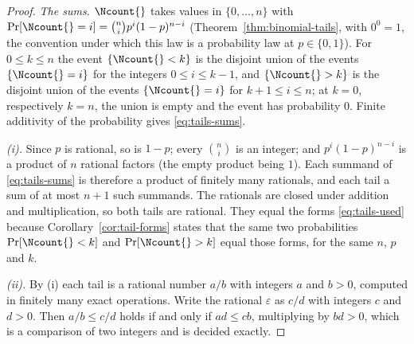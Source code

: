 \begin{proof}
\emph{The sums.} $\Ncount{}$ takes values in $\{0,\dots,n\}$ with
$\Pr[\Ncount{}=i]=\binom{n}{i}p^{i}(1-p)^{n-i}$ (Theorem~\ref{thm:binomial-tails},
with $0^{0}=1$, the convention under which this law is a probability law at
$p\in\{0,1\}$). For $0\le k\le n$ the event $\{\Ncount{}<k\}$ is the disjoint
union of the events $\{\Ncount{}=i\}$ for the integers $0\le i\le k-1$, and
$\{\Ncount{}>k\}$ is the disjoint union of the events $\{\Ncount{}=i\}$ for
$k+1\le i\le n$; at $k=0$, respectively $k=n$, the union is empty and the
event has probability $0$. Finite additivity of the probability gives
\eqref{eq:tails-sums}.

\emph{(i).} Since $p$ is rational, so is $1-p$; every $\binom{n}{i}$ is an
integer; and $p^{i}(1-p)^{n-i}$ is a product of $n$ rational factors (the
empty product being $1$). Each summand of \eqref{eq:tails-sums} is therefore
a product of finitely many rationals, and each tail a sum of at most $n+1$
such summands. The rationals are closed under addition and multiplication, so
both tails are rational. They equal the forms \eqref{eq:tails-used} because
Corollary~\ref{cor:tail-forms} states that the same two probabilities
$\Pr[\Ncount{}<k]$ and $\Pr[\Ncount{}>k]$ equal those forms, for the same
$n$, $p$ and $k$.

\emph{(ii).} By (i) each tail is a rational number $a/b$ with integers $a$
and $b>0$, computed in finitely many exact operations. Write the rational
$\varepsilon$ as $c/d$ with integers $c$ and $d>0$. Then
$a/b\le c/d$ holds if and only if $ad\le cb$, multiplying by $bd>0$, which is
a comparison of two integers and is decided exactly.
\end{proof}
